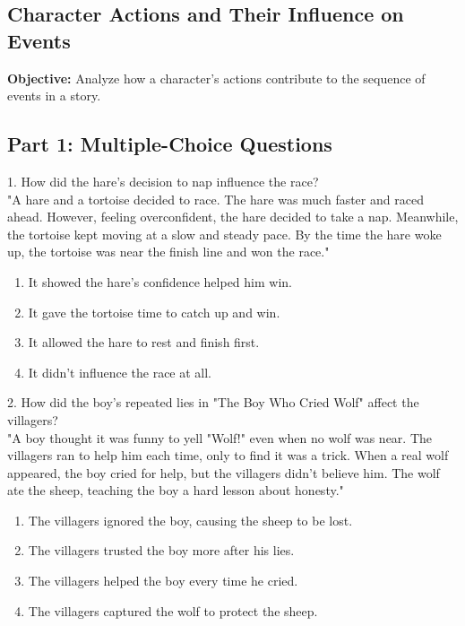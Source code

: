 \documentclass[12pt]{article}
\begin{document}
\vspace{1cm}




\subsection*{Character Actions and Their Influence on Events}
\onehalfspacing

\begin{tcolorbox}[colframe=black!40, colback=gray!0, title=Learning Objective]
\textbf{Objective:} Analyze how a character's actions contribute to the sequence of events in a story.
\end{tcolorbox}

\subsection*{Part 1: Multiple-Choice Questions}

1. How did the hare’s decision to nap influence the race? \\
"A hare and a tortoise decided to race. The hare was much faster and raced ahead. However, feeling overconfident, the hare decided to take a nap. Meanwhile, the tortoise kept moving at a slow and steady pace. By the time the hare woke up, the tortoise was near the finish line and won the race."\\
\begin{enumerate}[label=\Alph*.]
    \item It showed the hare's confidence helped him win.
    \item It gave the tortoise time to catch up and win.
    \item It allowed the hare to rest and finish first.
    \item It didn’t influence the race at all.
\end{enumerate}

\vspace{1cm}

2. How did the boy’s repeated lies in "The Boy Who Cried Wolf" affect the villagers?\\
"A boy thought it was funny to yell "Wolf!" even when no wolf was near. The villagers ran to help him each time, only to find it was a trick. When a real wolf appeared, the boy cried for help, but the villagers didn’t believe him. The wolf ate the sheep, teaching the boy a hard lesson about honesty."\\
\begin{enumerate}[label=\Alph*.]
    \item The villagers ignored the boy, causing the sheep to be lost.
    \item The villagers trusted the boy more after his lies.
    \item The villagers helped the boy every time he cried.
    \item The villagers captured the wolf to protect the sheep.
\end{enumerate}
\end{document}
